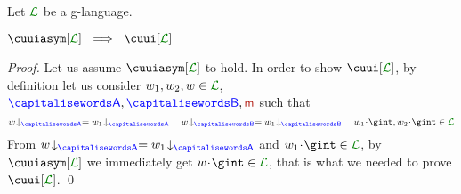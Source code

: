 \begin{proposition}
Let $\clang$ be a g-language.\\
\centerline{$\cuuiasym[{\clang}]\ \implies\ \cuui[\clang]$}
\end{proposition}
\begin{proof}
Let us assume $\cuuiasym[{\clang}]$ to hold. In order to show  $\cuui[{\clang}]$, 
by definition let us consider $\acword_1,\acword_2,\acword\in\clang$, $\p,\q,\msg$ such that
$$\proj{\acword}{A} =\proj{\acword_1}{A}\quad \proj{\acword}{B} =\proj{\acword_1}{B}
\quad \acword_1\cat\gint, \acword_2\cat\gint\in\clang$$
From $\proj{\acword}{A} =\proj{\acword_1}{A}$ and $\acword_1\cat\gint\in\clang$,
by $\cuuiasym[{\clang}]$ we immediately get  $\acword\cat\gint\in\clang$, that is what we needed to
prove $\cuui[\clang]$.
\qed
\end{proof}


